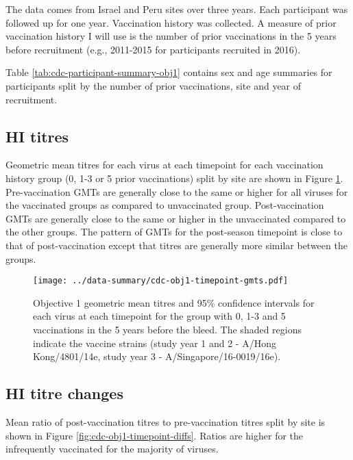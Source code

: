 \documentclass[12pt]{article}
\begin{document}
The data comes from Israel and Peru sites over three years. Each participant was followed up for one year. Vaccination history was collected. A measure of prior vaccination history I will use is the number of prior vaccinations in the 5 years before recruitment (e.g., 2011-2015 for participants recruited in 2016).

Table \ref{tab:cdc-participant-summary-obj1} contains sex and age summaries for participants split by the number of prior vaccinations, site and year of recruitment.



\subsection{HI titres}

Geometric mean titres for each virus at each timepoint for each vaccination history group (0, 1-3 or 5 prior vaccinations) split by site are shown in Figure
\ref{fig:cdc-obj1-timepoint-gmts}.
Pre-vaccination GMTs are generally close to the same
or higher for all viruses for the vaccinated groups as compared to unvaccinated group.
Post-vaccination GMTs are generally close to the same or higher in the unvaccinated compared to the other groups. The pattern of GMTs for the post-season timepoint is close to that
of post-vaccination except that titres are generally more similar between the groups.

\begin{figure}
	\texttt{[image: ../data-summary/cdc-obj1-timepoint-gmts.pdf]}
	\caption{Objective 1 geometric mean titres and 95\% confidence intervals for each virus at each timepoint for the group with 0, 1-3 and 5 vaccinations in the 5 years before the bleed. The shaded regions indicate the vaccine strains (study year 1 and 2 - A/Hong Kong/4801/14e, study year 3 - A/Singapore/16-0019/16e).}
	\label{fig:cdc-obj1-timepoint-gmts}
\end{figure}

\subsection{HI titre changes}

Mean ratio of post-vaccination titres to pre-vaccination titres split by site is shown in Figure
\ref{fig:cdc-obj1-timepoint-diffs}. Ratios are higher for the infrequently
vaccinated for the majority of viruses.
\end{document}
